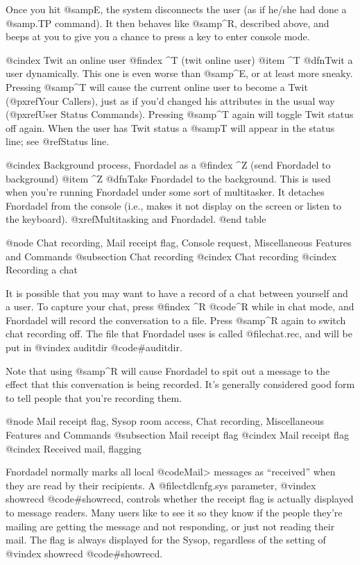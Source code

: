 Once you hit @samp{E}, the system disconnects the user (as if he/she had
done a @samp{.TP} command).  It then behaves like @samp{^R}, described above,
and beeps at you to give you a chance to press a key to enter console mode.

@cindex Twit an online user
@findex ^T (twit online user)
@item ^T
@dfn{Twit a user dynamically}.  This one is even worse than @samp{^E}, or
at least more sneaky.  Pressing @samp{^T} will cause the current online
user to become a Twit (@pxref{Your Callers}), just as if you'd changed his
attributes in the usual way (@pxref{User Status Commands}).  Pressing @samp{^T}
again will toggle Twit status off again.  When the user has Twit status a
@samp{T} will appear in the status line; see @ref{Status line}.

@cindex Background process, Fnordadel as a
@findex ^Z (send Fnordadel to background)
@item ^Z
@dfn{Take Fnordadel to the background}.  This is used when you're running
Fnordadel under some sort of multitasker.  It detaches Fnordadel from the
console (i.e., makes it not display on the screen or listen to the keyboard).
@xref{Multitasking and Fnordadel}.
@end table

@node Chat recording, Mail receipt flag, Console request, Miscellaneous Features and Commands
@subsection Chat recording
@cindex Chat recording
@cindex Recording a chat

It is possible that you may want to have a record of a chat
between yourself and a user.  To capture your chat, press
@findex ^R
@code{^R} while
in chat mode, and Fnordadel will record the conversation to a
file.  Press @samp{^R} again to switch chat recording off.  The file that
Fnordadel uses is called @file{chat.rec}, and will be put in
@vindex auditdir
@code{#auditdir}.

Note that using @samp{^R} will cause Fnordadel to
spit out a message to the effect that this conversation is being
recorded.  It's generally considered good form to tell people that
you're recording them.

@node Mail receipt flag, Sysop room access, Chat recording, Miscellaneous Features and Commands
@subsection Mail receipt flag
@cindex Mail receipt flag
@cindex Received mail, flagging

Fnordadel normally marks all local @code{Mail>} messages as ``received''
when they are read by their recipients.  A @file{ctdlcnfg.sys} parameter,
@vindex showrecd
@code{#showrecd}, controls whether the receipt flag is actually displayed
to message readers.  Many users like to see it so
they know if the people they're mailing are getting the message and
not responding, or just not reading their mail.  The flag is always
displayed for the Sysop, regardless of the setting of
@vindex showrecd
@code{#showrecd}.

